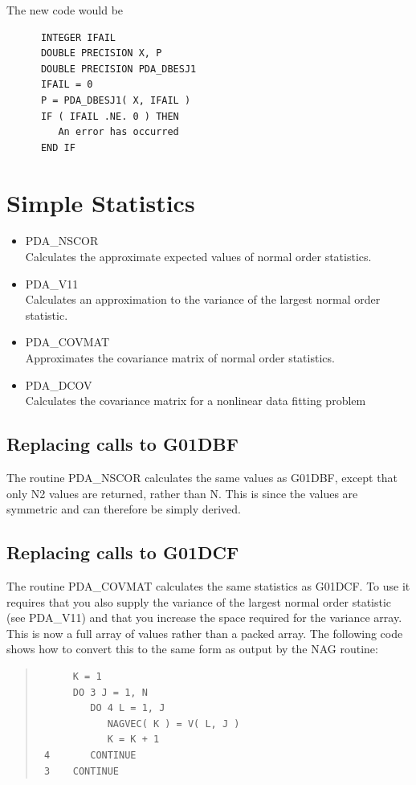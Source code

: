 \documentclass[11pt,twoside]{article}
\newcommand{\htmlref}[2]{#1}
\newcommand{\xlabel}[1]{}
\begin{document}
   The new code would be

\begin{verbatim}
      INTEGER IFAIL
      DOUBLE PRECISION X, P
      DOUBLE PRECISION PDA_DBESJ1
      IFAIL = 0
      P = PDA_DBESJ1( X, IFAIL )
      IF ( IFAIL .NE. 0 ) THEN
         An error has occurred
      END IF
\end{verbatim}

\section{\xlabel{simple_statistics}Simple Statistics}
\begin{itemize}
   \item \htmlref{PDA\_NSCOR}{PDA\_NSCOR} \\
         Calculates the approximate expected values of normal order statistics.
   \item \htmlref{PDA\_V11}{PDA\_V11} \\
         Calculates an approximation to the variance of the largest
         normal order statistic.
   \item \htmlref{PDA\_COVMAT}{PDA\_COVMAT} \\
         Approximates the covariance matrix of normal order statistics.
   \item \htmlref{PDA\_DCOV}{PDA\_DCOV} \\
    Calculates the covariance matrix for a nonlinear data fitting problem
\end{itemize}

\subsection{\xlabel{replacing_calls_to_g01dbf}Replacing calls to G01DBF}
The routine PDA\_NSCOR calculates the same values as G01DBF, except
that only N2 values are returned, rather than N. This is since the
values are symmetric and can therefore be simply derived.

\subsection{\xlabel{replacing_calls_to_g01dcf}Replacing calls to G01DCF}
The routine PDA\_COVMAT calculates the same statistics as G01DCF. To
use it requires that you also supply the variance of the largest
normal order statistic (see PDA\_V11) and that you increase the space
required for the variance array. This is now a full array of values
rather than a packed array. The following code shows how to convert
this to the same form as output by the NAG routine:
\begin{quote}
\begin{verbatim}
      K = 1
      DO 3 J = 1, N
         DO 4 L = 1, J
            NAGVEC( K ) = V( L, J )
            K = K + 1
 4       CONTINUE
 3    CONTINUE
\end{verbatim}
\end{quote}
\end{document}
